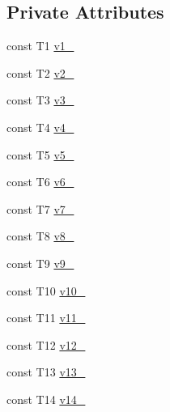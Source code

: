 \subsection*{Private Attributes}
\begin{DoxyCompactItemize}
\item 
const T1 \mbox{\hyperlink{classtesting_1_1internal_1_1_value_array14_a183867d5847df5d01d9ca11a23c72b15}{v1\+\_\+}}
\item 
const T2 \mbox{\hyperlink{classtesting_1_1internal_1_1_value_array14_a1026123e19636e06543614558246555c}{v2\+\_\+}}
\item 
const T3 \mbox{\hyperlink{classtesting_1_1internal_1_1_value_array14_afb68b47586809eb780b27fa997f9efe7}{v3\+\_\+}}
\item 
const T4 \mbox{\hyperlink{classtesting_1_1internal_1_1_value_array14_a91622547b380694c0169bb4dae728540}{v4\+\_\+}}
\item 
const T5 \mbox{\hyperlink{classtesting_1_1internal_1_1_value_array14_acbfcb85c79844404b67daf39439b5cdb}{v5\+\_\+}}
\item 
const T6 \mbox{\hyperlink{classtesting_1_1internal_1_1_value_array14_a5ba16802a9e9003b070eb5fa5aae95d6}{v6\+\_\+}}
\item 
const T7 \mbox{\hyperlink{classtesting_1_1internal_1_1_value_array14_a57d3b81b9f8abcf237a72ac887d1fa63}{v7\+\_\+}}
\item 
const T8 \mbox{\hyperlink{classtesting_1_1internal_1_1_value_array14_af35b8c435cb4a0c4c4698d00533d8fbd}{v8\+\_\+}}
\item 
const T9 \mbox{\hyperlink{classtesting_1_1internal_1_1_value_array14_abaa254af69061f7333ec517cd566376b}{v9\+\_\+}}
\item 
const T10 \mbox{\hyperlink{classtesting_1_1internal_1_1_value_array14_a71e592c9873ed37eea927b6957b8a6b4}{v10\+\_\+}}
\item 
const T11 \mbox{\hyperlink{classtesting_1_1internal_1_1_value_array14_a7b02a117df5bdb7ac3ded6db4dfd4ebc}{v11\+\_\+}}
\item 
const T12 \mbox{\hyperlink{classtesting_1_1internal_1_1_value_array14_ad3cfd29d6ec1951f5965612aba27a91a}{v12\+\_\+}}
\item 
const T13 \mbox{\hyperlink{classtesting_1_1internal_1_1_value_array14_a73fa2e5f463ff0c5264f170d2b3df779}{v13\+\_\+}}
\item 
const T14 \mbox{\hyperlink{classtesting_1_1internal_1_1_value_array14_a05ab1ae321d37aa8c237d3d20d282a5c}{v14\+\_\+}}
\end{DoxyCompactItemize}


